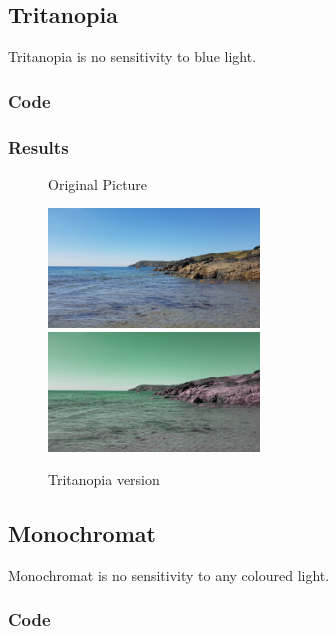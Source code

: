 \documentclass{Report}
\begin{document}
\newpage

\subsection{Tritanopia}

Tritanopia is no sensitivity to blue light. \autocites{Types}
\subsubsection{Code}


\newpage

\subsubsection{Results}
\begin{figure}[h!]
  \centering
  \caption{Original Picture}
  \includegraphics[width=0.5\textwidth]{Lizard}
  \centering
  \includegraphics[width=0.5\textwidth]{./ColourBlindness/Dichromat/Tritanopia.jpg}
  \caption{Tritanopia version}
\end{figure}

\newpage

\subsection{Monochromat}

Monochromat is no sensitivity to any coloured light. \autocites{Types}
\subsubsection{Code}

\end{document}
